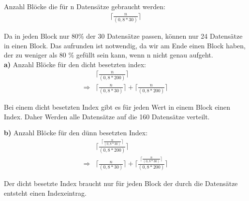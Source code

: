 \documentclass[12pt]{article}
\begin{document}
Anzahl Blöcke die für n Datensätze gebraucht werden:
\begin{align*}
    \lceil \frac{n}{(0,8 * 30)} \rceil
\end{align*}

\noindent
Da in jeden Block nur 80\% der 30 Datensätze passen, können nur 24 Datensätze in einen Block. Das aufrunden ist notwendig, da wir am Ende einen Block haben, der zu weniger als 80 \% gefüllt sein kann, wenn n nicht genau aufgeht. \\

\noindent
\textbf{a)} 
Anzahl Blöcke für den dicht besetzten index:
\begin{align*}
    &\lceil \frac{n}{(0,8 * 200)} \rceil \\
	\Rightarrow
	&\lceil \frac{n}{(0,8 * 30)} \rceil +  \lceil \frac{n}{(0,8 * 200)} \rceil
\end{align*}

\noindent 
Bei einem dicht besetzten Index gibt es für jeden Wert in einem Block einen Index.  Daher Werden alle Datensätze auf die 160 Datensätze verteilt. 

\noindent
\textbf{b)} 
Anzahl Blöcke für den dünn besetzten Index:
\begin{align*}
    &\lceil \frac{\lceil \frac{n}{(0,8 * 30)} \rceil}{(0,8 * 200)} \rceil \\
	\Rightarrow
	&\lceil \frac{n}{(0,8 * 30)} \rceil +  \lceil \frac{\lceil \frac{n}{(0,8 * 30)} \rceil}{(0,8 * 200)} \rceil
\end{align*}

\noindent
Der dicht besetzte Index braucht nur für jeden Block der durch die Datensätze entsteht einen Indexeintrag.
\end{document}
